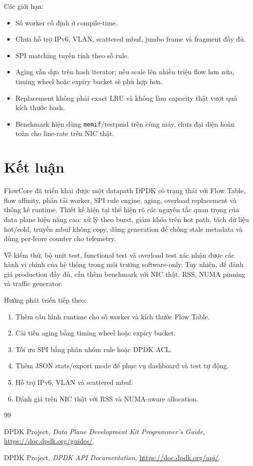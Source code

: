 \documentclass[12pt,a4paper]{report}
\DeclareRobustCommand{\code}[1]{{\small\texttt{#1}}}
\begin{document}
Các giới hạn:

\begin{itemize}
    \item Số worker cố định ở compile-time.
    \item Chưa hỗ trợ IPv6, VLAN, scattered mbuf, jumbo frame và fragment đầy đủ.
    \item SPI matching tuyến tính theo số rule.
    \item Aging vẫn dựa trên hash iterator; nếu scale lên nhiều triệu flow hơn nữa, timing wheel hoặc expiry bucket sẽ phù hợp hơn.
    \item Replacement không phải exact LRU và không làm capacity thật vượt quá kích thước hash.
    \item Benchmark hiện dùng \code{memif}/testpmd trên cùng máy, chưa đại diện hoàn toàn cho line-rate trên NIC thật.
\end{itemize}

\chapter{Kết luận}

FlowCore đã triển khai được một datapath DPDK có trạng thái với Flow Table, flow affinity, phân tải worker, SPI rule engine, aging, overload replacement và thống kê runtime. Thiết kế hiện tại thể hiện rõ các nguyên tắc quan trọng của data plane hiệu năng cao: xử lý theo burst, giảm khóa trên hot path, tách dữ liệu hot/cold, truyền mbuf không copy, dùng generation để chống stale metadata và dùng per-lcore counter cho telemetry.

Về kiểm thử, bộ unit test, functional test và overload test xác nhận được các hành vi chính của hệ thống trong môi trường software-only. Tuy nhiên, để đánh giá production đầy đủ, cần thêm benchmark với NIC thật, RSS, NUMA pinning và traffic generator.

Hướng phát triển tiếp theo:

\begin{enumerate}
    \item Thêm cấu hình runtime cho số worker và kích thước Flow Table.
    \item Cải tiến aging bằng timing wheel hoặc expiry bucket.
    \item Tối ưu SPI bằng phân nhóm rule hoặc DPDK ACL.
    \item Thêm JSON stats/export mode để phục vụ dashboard và test tự động.
    \item Hỗ trợ IPv6, VLAN và scattered mbuf.
    \item Đánh giá trên NIC thật với RSS và NUMA-aware allocation.
\end{enumerate}

\begin{thebibliography}{99}

DPDK Project, \textit{Data Plane Development Kit Programmer's Guide}, \url{https://doc.dpdk.org/guides/}.

DPDK Project, \textit{DPDK API Documentation}, \url{https://doc.dpdk.org/api/}.

\end{thebibliography}
\end{document}
